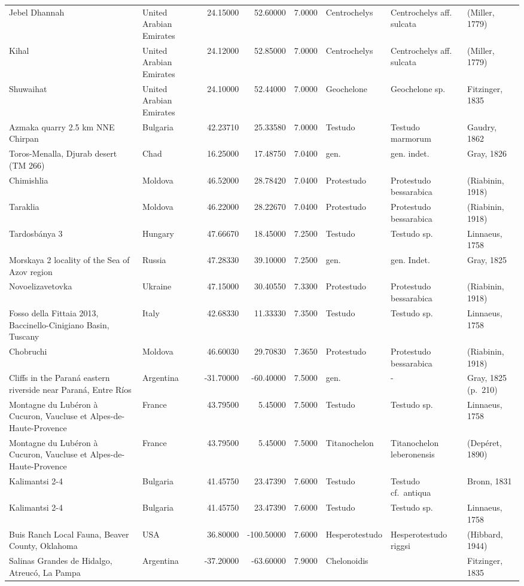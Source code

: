 \documentclass[]{article}
\begin{document}
\begin{longtable}[]{@{}llrrrlll@{}}
Jebel Dhannah & United Arabian Emirates & 24.15000 & 52.60000 & 7.0000 &
Centrochelys & Centrochelys aff. sulcata & (Miller, 1779)\tabularnewline
Kihal & United Arabian Emirates & 24.12000 & 52.85000 & 7.0000 &
Centrochelys & Centrochelys aff. sulcata & (Miller, 1779)\tabularnewline
Shuwaihat & United Arabian Emirates & 24.10000 & 52.44000 & 7.0000 &
Geochelone & Geochelone sp. & Fitzinger, 1835\tabularnewline
Azmaka quarry 2.5 km NNE Chirpan & Bulgaria & 42.23710 & 25.33580 &
7.0000 & Testudo & Testudo marmorum & Gaudry, 1862\tabularnewline
Toros-Menalla, Djurab desert (TM 266) & Chad & 16.25000 & 17.48750 &
7.0400 & gen. & gen. indet. & Gray, 1826\tabularnewline
Chimishlia & Moldova & 46.52000 & 28.78420 & 7.0400 & Protestudo &
Protestudo bessarabica & (Riabinin, 1918)\tabularnewline
Taraklia & Moldova & 46.22000 & 28.22670 & 7.0400 & Protestudo &
Protestudo bessarabica & (Riabinin, 1918)\tabularnewline
Tardosbánya 3 & Hungary & 47.66670 & 18.45000 & 7.2500 & Testudo &
Testudo sp. & Linnaeus, 1758\tabularnewline
Morskaya 2 locality of the Sea of Azov region & Russia & 47.28330 &
39.10000 & 7.2500 & gen. & gen. Indet. & Gray, 1825\tabularnewline
Novoelizavetovka & Ukraine & 47.15000 & 30.40550 & 7.3300 & Protestudo &
Protestudo bessarabica & (Riabinin, 1918)\tabularnewline
Fosso della Fittaia 2013, Baccinello-Cinigiano Basin, Tuscany & Italy &
42.68330 & 11.33330 & 7.3500 & Testudo & Testudo sp. & Linnaeus,
1758\tabularnewline
Chobruchi & Moldova & 46.60030 & 29.70830 & 7.3650 & Protestudo &
Protestudo bessarabica & (Riabinin, 1918)\tabularnewline
Cliffs in the Paraná eastern riverside near Paraná, Entre Ríos &
Argentina & -31.70000 & -60.40000 & 7.5000 & gen. & - & Gray, 1825
(p.~210)\tabularnewline
Montagne du Lubéron à Cucuron, Vaucluse et Alpes-de-Haute-Provence &
France & 43.79500 & 5.45000 & 7.5000 & Testudo & Testudo sp. & Linnaeus,
1758\tabularnewline
Montagne du Lubéron à Cucuron, Vaucluse et Alpes-de-Haute-Provence &
France & 43.79500 & 5.45000 & 7.5000 & Titanochelon & Titanochelon
leberonensis & (Depéret, 1890)\tabularnewline
Kalimantsi 2-4 & Bulgaria & 41.45750 & 23.47390 & 7.6000 & Testudo &
Testudo cf.~antiqua & Bronn, 1831\tabularnewline
Kalimantsi 2-4 & Bulgaria & 41.45750 & 23.47390 & 7.6000 & Testudo &
Testudo sp. & Linnaeus, 1758\tabularnewline
Buis Ranch Local Fauna, Beaver County, Oklahoma & USA & 36.80000 &
-100.50000 & 7.6000 & Hesperotestudo & Hesperotestudo riggsi & (Hibbard,
1944)\tabularnewline
Salinas Grandes de Hidalgo, Atreucó, La Pampa & Argentina & -37.20000 &
-63.60000 & 7.9000 & Chelonoidis & & Fitzinger, 1835\tabularnewline

\end{longtable}
\end{document}
